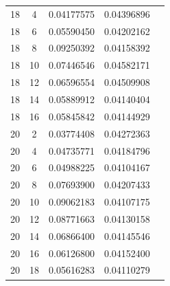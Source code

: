 \documentclass[letterpaper,12pt]{article}
\theoremstyle{remark}
\begin{document}
\begin{tabular}{ccccc}
18 & 4 & 0.04177575 & 0.04396896 \\
18 & 6 & 0.05590450 & 0.04202162 \\
18 & 8 & 0.09250392 & 0.04158392 \\
18 & 10 & 0.07446546 & 0.04582171 \\
18 & 12 & 0.06596554 & 0.04509908 \\
18 & 14 & 0.05889912 & 0.04140404 \\
18 & 16 & 0.05845842 & 0.04144929 \\
20 & 2 & 0.03774408 & 0.04272363 \\
20 & 4 & 0.04735771 & 0.04184796 \\
20 & 6 & 0.04988225 & 0.04104167 \\
20 & 8 & 0.07693900 & 0.04207433 \\
20 & 10 & 0.09062183 & 0.04107175 \\
20 & 12 & 0.08771663 & 0.04130158 \\
20 & 14 & 0.06866400 & 0.04145546 \\
20 & 16 & 0.06126800 & 0.04152400 \\
20 & 18 & 0.05616283 & 0.04110279 \\
\end{tabular}
\end{document}
